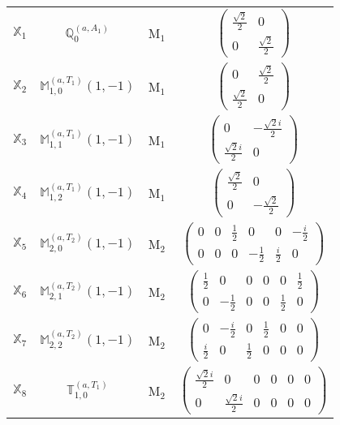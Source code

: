 \documentclass[fleqn,10pt,landscape]{article}
\begin{document}
\begin{itemize}
\begin{center}
\begin{longtable}{c|c|c|c}
$ \mathbb{X}_{1} $ & $\mathbb{Q}_{0}^{(a,A_{1})}$ & M$_{1}$ & $\begin{pmatrix} \frac{\sqrt{2}}{2} & 0 \\ 0 & \frac{\sqrt{2}}{2} \end{pmatrix}$ \\
$ \mathbb{X}_{2} $ & $\mathbb{M}_{1,0}^{(a,T_{1})}(1,-1)$ & M$_{1}$ & $\begin{pmatrix} 0 & \frac{\sqrt{2}}{2} \\ \frac{\sqrt{2}}{2} & 0 \end{pmatrix}$ \\
$ \mathbb{X}_{3} $ & $\mathbb{M}_{1,1}^{(a,T_{1})}(1,-1)$ & M$_{1}$ & $\begin{pmatrix} 0 & - \frac{\sqrt{2} i}{2} \\ \frac{\sqrt{2} i}{2} & 0 \end{pmatrix}$ \\
$ \mathbb{X}_{4} $ & $\mathbb{M}_{1,2}^{(a,T_{1})}(1,-1)$ & M$_{1}$ & $\begin{pmatrix} \frac{\sqrt{2}}{2} & 0 \\ 0 & - \frac{\sqrt{2}}{2} \end{pmatrix}$ \\ \hline
$ \mathbb{X}_{5} $ & $\mathbb{M}_{2,0}^{(a,T_{2})}(1,-1)$ & M$_{2}$ & $\begin{pmatrix} 0 & 0 & \frac{1}{2} & 0 & 0 & - \frac{i}{2} \\ 0 & 0 & 0 & - \frac{1}{2} & \frac{i}{2} & 0 \end{pmatrix}$ \\
$ \mathbb{X}_{6} $ & $\mathbb{M}_{2,1}^{(a,T_{2})}(1,-1)$ & M$_{2}$ & $\begin{pmatrix} \frac{1}{2} & 0 & 0 & 0 & 0 & \frac{1}{2} \\ 0 & - \frac{1}{2} & 0 & 0 & \frac{1}{2} & 0 \end{pmatrix}$ \\
$ \mathbb{X}_{7} $ & $\mathbb{M}_{2,2}^{(a,T_{2})}(1,-1)$ & M$_{2}$ & $\begin{pmatrix} 0 & - \frac{i}{2} & 0 & \frac{1}{2} & 0 & 0 \\ \frac{i}{2} & 0 & \frac{1}{2} & 0 & 0 & 0 \end{pmatrix}$ \\
$ \mathbb{X}_{8} $ & $\mathbb{T}_{1,0}^{(a,T_{1})}$ & M$_{2}$ & $\begin{pmatrix} \frac{\sqrt{2} i}{2} & 0 & 0 & 0 & 0 & 0 \\ 0 & \frac{\sqrt{2} i}{2} & 0 & 0 & 0 & 0 \end{pmatrix}$ \\

\end{longtable}
\end{center}
\end{itemize}
\end{document}
